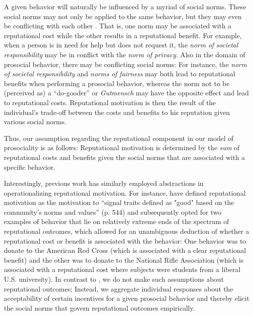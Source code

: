 \documentclass[AER]{AEA}
\begin{document}
A given behavior will naturally be influenced by a myriad of social norms. These social norms may not only be applied to the same behavior, but they may even be conflicting with each other \citep{cialdini_social_1998}. That is, one norm may be associated with a reputational cost while the other results in a reputational benefit. For example, when a person is in need for help but does not request it, the \textit{norm of societal responsibility} may be in conflict with the \textit{norm of privacy}. Also in the domain of prosocial behavior, there may be conflicting social norms: For instance, the \textit{norm of societal responsibility} \citep{cialdini_social_1998} and \textit{norms of fairness} \citep{fehr_theory_1999} may both lead to reputational benefits when performing a prosocial behavior, whereas the norm not to be (perceived as) a “do-gooder” or \textit{Gutmensch} \cite[see do-gooder derogation, which is the putting down of morally motivated others; ][]{minson_-gooder_2012, tasimi_-gooder_2015} may have the opposite effect and lead to reputational costs. Reputational motivation is then the result of the individual’s trade-off between the costs and benefits to his reputation given various social norms.

Thus, our assumption regarding the reputational component in our model of prosociality is as follows: Reputational motivation is determined by the \textit{sum} of reputational costs and benefits given the social norms that are associated with a specific behavior.
	
Interestingly, previous work has similarly employed abstractions in operationalizing reputational motivation. For instance, \cite{ariely_doing_2009} have defined reputational motivation as the motivation to “signal traits defined as "good" based on the community's norms and values” (p. 544) and subsequently opted for two examples of behavior that lie on relatively extreme ends of the spectrum of reputational outcomes, which allowed for an unambiguous deduction of whether a reputational cost or benefit is associated with the behavior: One behavior was to donate to the American Red Cross (which is associated with a clear reputational benefit) and the other was to donate to the National Rifle Association (which is associated with a reputational cost where subjects were students from a liberal U.S. university). In contrast to \cite{ariely_doing_2009}, we do not make such assumptions about reputational outcomes; Instead, we aggregate individual responses about the acceptability of certain incentives for a given prosocial behavior and thereby elicit the social norms that govern reputational outcomes empirically. 
\end{document}
